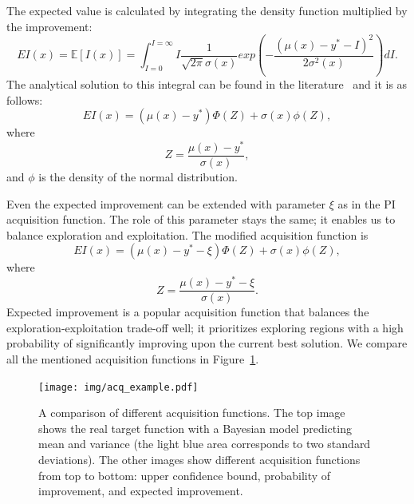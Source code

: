 The expected value is calculated by integrating the density function multiplied by the improvement:
\[ EI(x) = \mathbb{E}[I(x)] = \int_{I=0}^{I=\infty} I\frac{1}{\sqrt{2 \pi}\sigma(x)} exp\left(-\frac{(\mu(x)-y^*-I)^2}{2\sigma^2(x)}\right) dI. \]
The analytical solution to this integral can be found in the literature~\cite{jones1998efficient} and it is as follows:
\[ EI(x) = (\mu(x)-y^*)\Phi(Z)+\sigma(x)\phi(Z), \]
where
\[ Z=\frac{\mu(x)-y^*}{\sigma(x)}, \]
and $\phi$ is the density of the normal distribution.

Even the expected improvement can be extended with parameter $\xi$ as in the PI acquisition function. The role of this parameter stays the same; it enables us to balance exploration and exploitation. The modified acquisition function is
\[
EI(x) = (\mu(x)-y^*-\xi)\Phi(Z)+\sigma(x)\phi(Z), \]
where
\[ Z=\frac{\mu(x)-y^*-\xi}{\sigma(x)}. \]
 Expected improvement is a popular acquisition function that balances the exploration-exploitation trade-off well; it prioritizes exploring regions with a high probability of significantly improving upon the current best solution. We compare all the mentioned acquisition functions in Figure~\ref{fig:ei}.

 \begin{figure}
    \centering
    \texttt{[image: img/acq\_example.pdf]}
    \caption{A comparison of different acquisition functions. The top image shows the real target function with a Bayesian model predicting mean and variance (the light blue area corresponds to two standard deviations). The other images show different acquisition functions from top to bottom: upper confidence bound, probability of improvement, and expected improvement.}
    \label{fig:ei}
\end{figure}



\newpage
